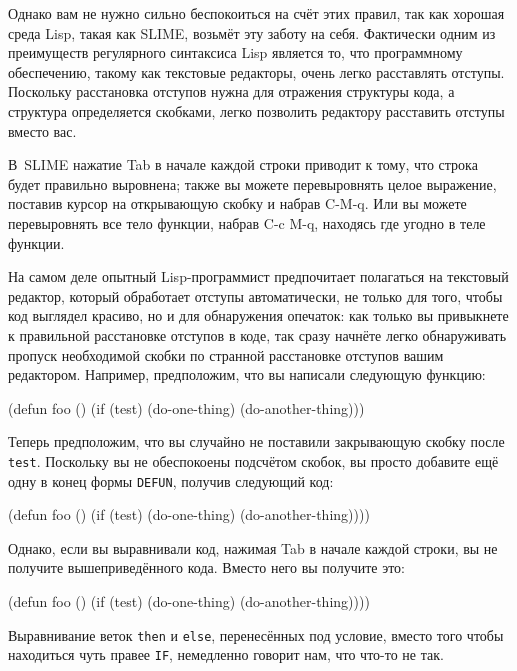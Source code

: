 Однако вам не нужно сильно беспокоиться на счёт этих правил, так как хорошая среда Lisp,
такая как SLIME, возьмёт эту заботу на себя. Фактически одним из преимуществ регулярного
синтаксиса Lisp является то, что программному обеспечению, такому как текстовые редакторы,
очень легко расставлять отступы. Поскольку расстановка отступов нужна для отражения
структуры кода, а структура определяется скобками, легко позволить редактору расставить
отступы вместо вас.

В~SLIME нажатие Tab в начале каждой строки приводит к тому, что строка будет правильно
выровнена; также вы можете перевыровнять целое выражение, поставив курсор на открывающую
скобку и набрав C-M-q. Или вы можете перевыровнять все тело функции, набрав C-c M-q,
находясь где угодно в теле функции.

На самом деле опытный Lisp-программист предпочитает полагаться на текстовый редактор,
который обработает отступы автоматически, не только для того, чтобы код выглядел красиво,
но и для обнаружения опечаток: как только вы привыкнете к правильной расстановке отступов
в коде, так сразу начнёте легко обнаруживать пропуск необходимой скобки по странной
расстановке отступов вашим редактором. Например, предположим, что вы написали следующую
функцию:

\begin{myverb}
(defun foo ()
  (if (test)
    (do-one-thing)
    (do-another-thing)))
\end{myverb}

Теперь предположим, что вы случайно не поставили закрывающую скобку после
\lstinline{test}. Поскольку вы не обеспокоены подсчётом скобок, вы просто добавите ещё одну в
конец формы \lstinline{DEFUN}, получив следующий код:

\begin{myverb}
(defun foo ()
  (if (test)
    (do-one-thing)
    (do-another-thing))))
\end{myverb}

Однако, если вы выравнивали код, нажимая Tab в начале каждой строки, вы не получите
вышеприведённого кода. Вместо него вы получите это:

\begin{myverb}
(defun foo ()
  (if (test)
       (do-one-thing)
       (do-another-thing))))
\end{myverb}

Выравнивание веток \lstinline{then} и \lstinline{else}, перенесённых под условие, вместо того чтобы
находиться чуть правее \lstinline{IF}, немедленно говорит нам, что что-то не так.

